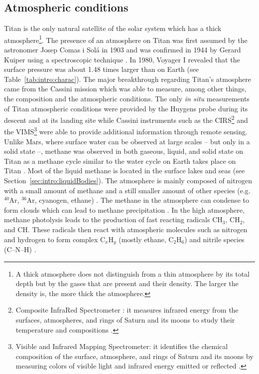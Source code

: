 \subsection{Atmospheric conditions}
\label{sec:intro:atm_cond}
Titan is the only natural satellite of the solar system which has a thick atmosphere\footnote{A thick atmosphere does not distinguish from a thin atmosphere by its total depth but by the gases that are present and their density. The larger the density is, the more thick the atmosphere.}. The presence of an atmosphere on Titan was first assumed by the astronomer Josep Comas i Sol\'a in 1903 and was confirmed in 1944 by Gerard Kuiper using a spectroscopic technique \citep{kuiper1944titan}. In 1980, Voyager I revealed that the surface pressure was about 1.48 times larger than on Earth (see Table~\ref{tab:intro:charac}). The major breakthrough regarding Titan's atmosphere came from the Cassini mission which was able to measure, among other things, the composition and the atmospheric conditions. The only \textit{in situ} measurements of Titan atmospheric conditions were provided by the Huygens probe during its descent and at its landing site \citep[see][]{fulchignoni2005situ} while Cassini instruments such as the CIRS\footnote{Composite InfraRed Spectrometer : it measures infrared energy from the surfaces, atmospheres, and rings of Saturn and its moons to study their temperature and compositions \citep{flasar2004exploring}.} and the VIMS\footnote{Visible and Infrared Mapping Spectrometer: it identifies the chemical composition of the surface, atmosphere, and rings of Saturn and its moons by measuring colors of visible light and infrared energy emitted or reflected \citep{brown2004cassini}.} were able to provide additional information through remote sensing.
Unlike Mars, where surface water can be observed at large scales -- but only in a solid state --, methane was observed in both gaseous, liquid, and solid state on Titan as a methane cycle similar to the water cycle on Earth takes place on Titan \citep{atreya2006titan}. Most of the liquid methane is located in the surface lakes and seas (see Section~\ref{sec:intro:liquidBodies}). The atmosphere is mainly composed of nitrogen with a small amount of methane and a still smaller amount of other species (e.g. $^{40}$Ar, $^{36}$Ar, cyanogen, ethane) \citep{niemann2005abundances} \citep[for a detailed composition, see Table 1 in][]{cordier2009estimate}. The methane in the atmosphere can condense to form clouds \citep{toon1988methane, griffith2000detection, porco2005imaging} which can lead to methane precipitation \citep{toon1988methane}. In the high atmosphere, methane photolysis leads to the production of fast reacting radicals CH$_3$, CH$_2$, and CH. These radicals then react with atmospheric molecules such as nitrogen and hydrogen to form complex C$_x$H$_y$ (mostly ethane, C$_2$H$_6$) and nitrile species (C--N--H) \citep{atreya2006titan}. 

